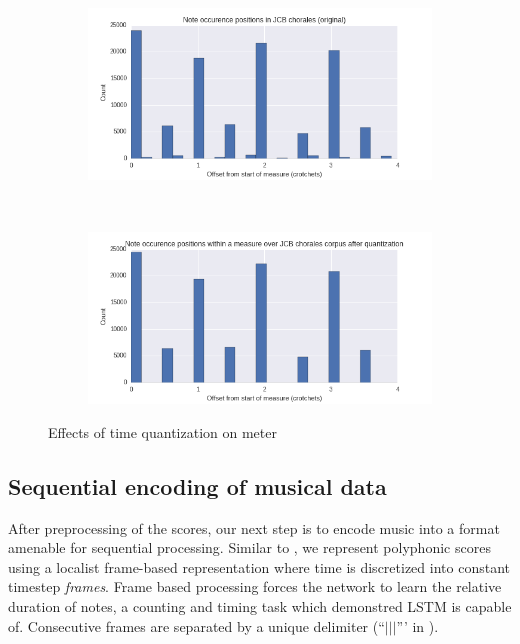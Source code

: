 \documentclass[dissertation.tex]{subfiles}
\begin{document}
\begin{figure}[htpb]
    \centering
    \begin{subfigure}[t]{0.48\textwidth}
        \centering
        \includegraphics[width=1.0\linewidth]{Figures/meter-usage-original.png}
    \end{subfigure}
    ~
    \begin{subfigure}[t]{0.48\textwidth}
        \centering
        \includegraphics[width=1.0\linewidth]{Figures/meter-usage-quantized.png}
    \end{subfigure}
    \caption{Effects of time quantization on meter}
    \label{fig:meter-time-quantization}
\end{figure}

\subsection{Sequential encoding of musical data}

After preprocessing of the scores, our next step is to encode music into a
format amenable for sequential processing. Similar to
\cite{todd1989connectionist}, we represent polyphonic scores using a localist
frame-based representation where time is discretized into constant timestep
\emph{frames}. Frame based processing forces the network to learn the relative
duration of notes, a counting and timing task which \cite{gers2002learning}
demonstred LSTM is capable of. Consecutive frames are separated by a unique
delimiter (``$|||$''' in ).
\end{document}
